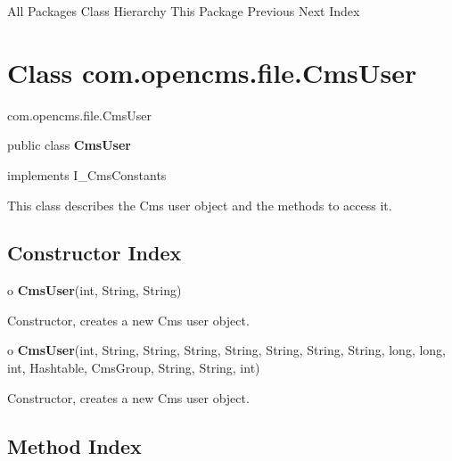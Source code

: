 \begin{PRE}
All Packages  Class Hierarchy  This Package  Previous  Next  Index
\end{PRE}

\htmlHR

\section{  Class com.opencms.file.CmsUser }

\begin{PRE}
com.opencms.file.CmsUser
\end{PRE}

\htmlHR

\begin{description}
\item public class {\bf CmsUser}  
\item implements I\_CmsConstants 
\end{description}

This class describes the Cms user object and the methods to access it. 

\htmlHR

\subsection*{  Constructor Index }

\begin{description}
\item o {\bf CmsUser}(int, String, String)  

Constructor, creates a new Cms user object.  
\item o {\bf CmsUser}(int, String, String, String, String, String, String,
String, long, long, int, Hashtable, CmsGroup, String, String, int)  

Constructor, creates a new Cms user object. 
\end{description}

\subsection*{  Method Index }

